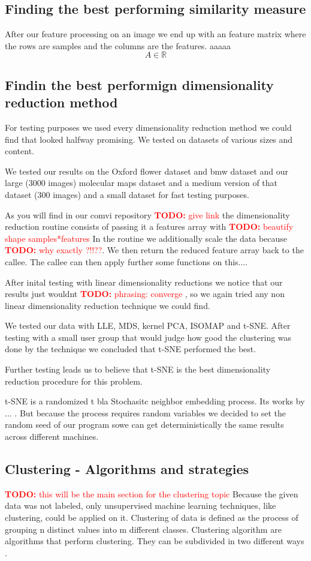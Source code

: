 \documentclass[journal]{vgtc}       %
\newcommand{\todo}[1]{\textcolor{red}{\textbf{TODO:} #1}}
\begin{document}
\subsection{Finding the best performing similarity measure}

After our feature processing on an image we end up with an feature matrix where the rows are samples  and the columns are the features. aaaaa \[A \in \mathbb{R}\]


\subsection{Findin the best performign dimensionality reduction method}
For testing purposes we used every dimensionality reduction method we could find that looked halfway promising. We tested on datasets of various sizes and content.

We tested our results on the Oxford flower dataset and bmw dataset and our large (3000 images) molecular maps dataset and a medium version of that dataset (300 images) and a small dataset for fast testing purposes.

As you will find in our comvi repository \todo{give link} the dimensionality reduction routine consists of passing it a features array with \todo{beautify shape samples*features}
In the routine we additionally scale the data because \todo{why exactly ?!!??}.
We then return the reduced feature array back to the callee. The callee can then apply further some functions on this....

After inital testing with linear dimensionality reductions we notice that our results just wouldnt \todo{phrasing: converge }, so we again tried any non linear dimensionality reduction technique we could find.

We tested our data with LLE, MDS, kernel PCA, ISOMAP and t-SNE.
After testing with a small user group that would judge how good the clustering was done by the technique we concluded that t-SNE performed the best.

Further testing leads us to believe that t-SNE is the best dimensionality reduction procedure for this problem.

t-SNE is a randomized t bla Stochasitc neighbor embedding process. Its works by ... . But because the process requires random variables we decided to set the random seed of our program sowe can get deterministically the same results across different machines.

\subsection{Clustering - Algorithms and strategies }
\todo{this will be the main section for the clustering topic }
Because the given data was not labeled, only unsupervised machine learning techniques, like clustering, could be applied on it. 
Clustering of data is defined as the process of grouping n distinct values into m different classes. Clustering algorithm are algorithms that perform clustering. They can be subdivided in two different ways \cite{iir}.
\end{document}
